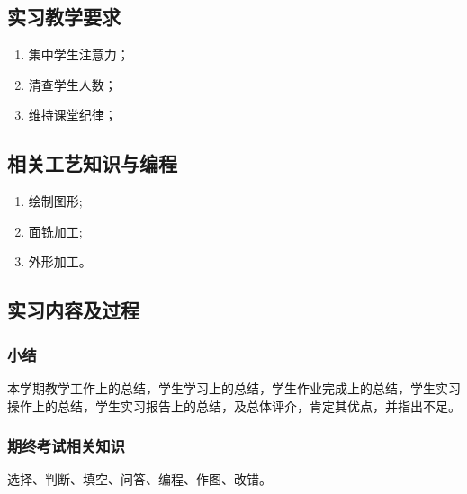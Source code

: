 \jxhj{%
	}

\makeshouye %

\subsection{实习教学要求}
\begin{enumerate}[\hspace{2em}1、]
	\item 集中学生注意力；
	\item 清查学生人数；
	\item 维持课堂纪律；
\end{enumerate}
\subsection{相关工艺知识与编程}
\begin{enumerate}[1、]
	\item 绘制图形;
	\item 面铣加工;
	\item 外形加工。
\end{enumerate}


\subsection{实习内容及过程}
\subsubsection{小结}
本学期教学工作上的总结，学生学习上的总结，学生作业完成上的总结，学生实习操作上的总结，学生实习报告上的总结，及总体评介，肯定其优点，并指出不足。
\subsubsection{期终考试相关知识}
选择、判断、填空、问答、编程、作图、改错。
